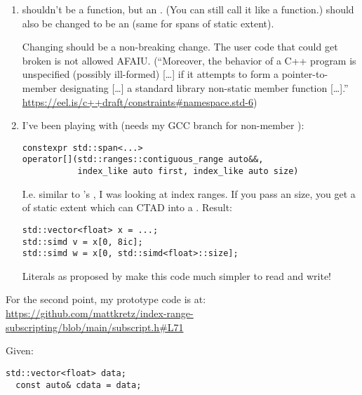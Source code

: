 \begin{enumerate}
  \item {} shouldn't be a function, but an
    .
    (You can still call it like a function.)
     should also be changed to be an
     (same for spans of static extent).

    Changing  should be a non-breaking change.
    The user code that could get broken is not allowed AFAIU.
    (“Moreover, the behavior of a C++ program is unspecified (possibly
      ill-formed) [\ldots] if it attempts to form a pointer-to-member
      designating [\ldots] a standard library non-static member function [\ldots].”
    \url{https://eel.is/c++draft/constraints#namespace.std-6})

  \item I've been playing with (needs my GCC branch for non-member
    ):
\medskip\begin{lstlisting}
constexpr std::span<...>
operator[](std::ranges::contiguous_range auto&&,
           index_like auto first, index_like auto size)
\end{lstlisting}
    I.e. similar to 's , I was
    looking at index ranges.
    If you pass an  size, you get a  of
    static extent which can CTAD into a .
    Result:
\medskip\begin{lstlisting}[style=Vc]
std::vector<float> x = ...;
std::simd v = x[0, 8ic];
std::simd w = x[0, std::simd<float>::size];
\end{lstlisting}
    Literals as proposed by \textcite{P2725R0} make this code much simpler to read and write!
\end{enumerate}

For the second point, my prototype code is at:\\
\url{https://github.com/mattkretz/index-range-subscripting/blob/main/subscript.h#L71}

Given:
\medskip\begin{lstlisting}[style=Vc]
  std::vector<float> data;
  const auto& cdata = data;
\end{lstlisting}

